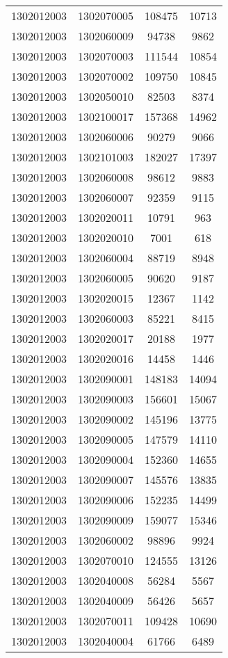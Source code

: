 \begin{longtable}{llcc}
1302012003 & 1302070005 & 108475 & 10713\\
1302012003 & 1302060009 & 94738 & 9862\\
1302012003 & 1302070003 & 111544 & 10854\\
1302012003 & 1302070002 & 109750 & 10845\\
1302012003 & 1302050010 & 82503 & 8374\\
1302012003 & 1302100017 & 157368 & 14962\\
1302012003 & 1302060006 & 90279 & 9066\\
1302012003 & 1302101003 & 182027 & 17397\\
1302012003 & 1302060008 & 98612 & 9883\\
1302012003 & 1302060007 & 92359 & 9115\\
1302012003 & 1302020011 & 10791 & 963\\
1302012003 & 1302020010 & 7001 & 618\\
1302012003 & 1302060004 & 88719 & 8948\\
1302012003 & 1302060005 & 90620 & 9187\\
1302012003 & 1302020015 & 12367 & 1142\\
1302012003 & 1302060003 & 85221 & 8415\\
1302012003 & 1302020017 & 20188 & 1977\\
1302012003 & 1302020016 & 14458 & 1446\\
1302012003 & 1302090001 & 148183 & 14094\\
1302012003 & 1302090003 & 156601 & 15067\\
1302012003 & 1302090002 & 145196 & 13775\\
1302012003 & 1302090005 & 147579 & 14110\\
1302012003 & 1302090004 & 152360 & 14655\\
1302012003 & 1302090007 & 145576 & 13835\\
1302012003 & 1302090006 & 152235 & 14499\\
1302012003 & 1302090009 & 159077 & 15346\\
1302012003 & 1302060002 & 98896 & 9924\\
1302012003 & 1302070010 & 124555 & 13126\\
1302012003 & 1302040008 & 56284 & 5567\\
1302012003 & 1302040009 & 56426 & 5657\\
1302012003 & 1302070011 & 109428 & 10690\\
1302012003 & 1302040004 & 61766 & 6489\\

\end{longtable}
